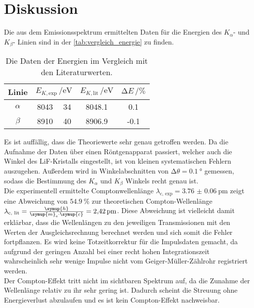 \section{Diskussion}
\label{sec:Diskussion}

Die aus dem Emissionsspektrum ermittelten Daten für die Energien des $K_{\alpha}$- und $K_{\beta}$- Linien sind in der \autoref{tab:vergleich_energie} zu finden. 

\begin{table}[H]
    \centering
    \caption{Die Daten der Energien im Vergleich mit den Literaturwerten.}
    \label{tab:vergleich_energie}
    \begin{tabular}{c c @{${} \pm {}$} c S[table-format=4.1] S[table-format=2.1]}
        \toprule
        Linie &  & {$E_{K, \text{lit}} \, / \si{\electronvolt} $ \cite{theoE}} & {$\increment E  \, / \si{\percent}$} \\
        \midrule
        $\alpha$ &  8043 & 34 & 8048.1 & 0.1 \\
        $\beta $  &  8910 & 40 & 8906.9 & -0.1 \\
        \bottomrule
    \end{tabular}
\end{table}

\noindent Es ist auffällig, dass die Theoriewerte sehr genau getroffen werden. Da die Aufnahme der Daten über einen Röntgenapparat passiert, welcher auch die 
Winkel des LiF-Kristalls eingestellt, ist von kleinen systematischen Fehlern auszugehen. Außerdem wird in Winkelabschnitten von $\increment \theta = \SI{0.1}{\degree}$ 
gemessen, sodass die Bestimmung des $K_{\alpha}$ und $K_{\beta}$ Winkels recht genau ist. \\


\noindent Die experimentell ermittelte Comptonwellenlänge $\lambda_{\text{c, exp}} = \SI{3.76(6)}{\pico\metre}$ zeigt eine Abweichung von $ \SI{54.9}{\percent}$
zur theoretischen Compton-Wellenlänge $\lambda_{\text{c, lit}} = \frac{\symup{h}}{\symup{m}_\text{e} \cdot \symup{c}} = \SI{2.42}{\pico\metre}$. Diese Abweichung ist vielleicht damit erklärbar, 
dass die Wellenlängen zu den jeweiligen Transmissionen mit den Werten der Ausgleichsrechnung berechnet werden und sich somit die Fehler fortpflanzen. 
Es wird keine Totzeitkorrektur für die Impulsdaten gemacht, da aufgrund der geringen Anzahl bei einer recht hohen Integrationszeit wahrscheinlich sehr wenige
Impulse nicht vom Geiger-Müller-Zählrohr registriert werden. \\
Der Compton-Effekt tritt nicht im sichtbaren Spektrum auf, da die Zunahme der Wellenlänge relativ zu ihr sehr gering ist. Dadurch scheint die Streuung ohne
Energieverlust abzulaufen und es ist kein Compton-Effekt nachweisbar. 